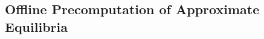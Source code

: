 \documentclass[letterpaper]{article}
\begin{document}


\subsection{Offline Precomputation of Approximate Equilibria}
\end{document}
